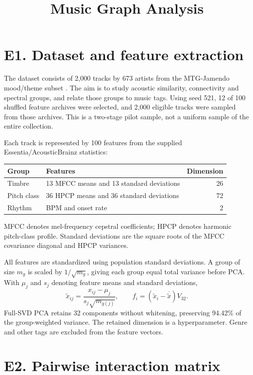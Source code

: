 \documentclass[11pt,letterpaper]{article}
\title{Music Graph Analysis}
\author{}
\date{}
\begin{document}
\maketitle
\vspace{-3em}

\section*{E1. Dataset and feature extraction}

The dataset consists of 2,000 tracks by 673 artists from the MTG-Jamendo mood/theme
subset \cite{jamendo,repository}. The aim is to study acoustic similarity,
connectivity and spectral groups, and relate those groups to music tags.
Using seed 521, 12 of 100 shuffled feature archives were selected, and 2,000
eligible tracks were sampled from those archives. This is a two-stage pilot
sample, not a uniform sample of the entire collection.

Each track is represented by 100 features from the supplied
Essentia/AcousticBrainz statistics:
\begin{center}
\begin{tabular}{llr}
\toprule
Group & Features & Dimension\\
\midrule
Timbre & 13 MFCC means and 13 standard deviations & 26\\
Pitch class & 36 HPCP means and 36 standard deviations & 72\\
Rhythm & BPM and onset rate & 2\\
\bottomrule
\end{tabular}
\end{center}
MFCC denotes mel-frequency cepstral coefficients; HPCP denotes harmonic
pitch-class profile. Standard deviations are the square roots of the MFCC
covariance diagonal and HPCP variances.

All features are standardized using population standard deviations. A group of
size $m_g$ is scaled by $1/\sqrt{m_g}$, giving each group equal total variance
before PCA. With $\mu_j$ and $s_j$ denoting feature means and standard deviations,
\[
 \widetilde{x}_{ij}=\frac{x_{ij}-\mu_j}{s_j\sqrt{m_{g(j)}}},
 \qquad f_i=(\widetilde{x}_i-\overline{\widetilde{x}})V_{32}.
\]
Full-SVD PCA retains 32 components without whitening, preserving 94.42\% of the
group-weighted variance. The retained dimension is a hyperparameter.
Genre and other tags are excluded from the feature vectors.

\section*{E2. Pairwise interaction matrix}
\end{document}
